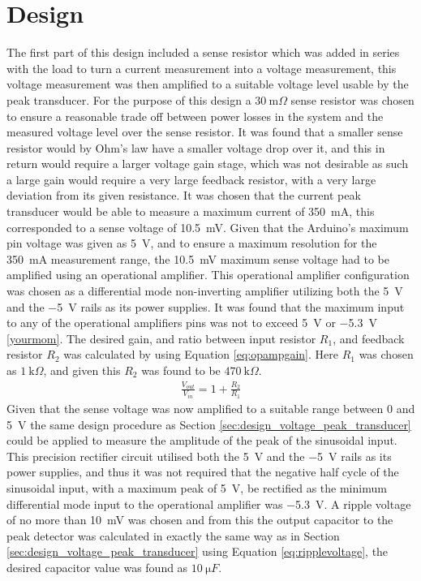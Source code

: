 \section{Design} \label{sec:design_current_peak_transducer}
The first part of this design included a sense resistor which was added in series with the load to turn a current measurement into a voltage measurement, this voltage measurement was then amplified to a suitable voltage level usable by the peak transducer. For the purpose of this design a $\SI{30}{\milli \Omega}$ sense resistor was chosen to ensure a reasonable trade off between power losses in the system and the measured voltage level over the sense resistor. It was found that a smaller sense resistor would by Ohm's law have a smaller voltage drop over it, and this in return would require a larger voltage gain stage, which was not desirable as such a large gain would require a very large feedback resistor, with a very large deviation from its given resistance. It was chosen that the current peak transducer would be able to measure a maximum current of \SI{350}{\milli A}, this corresponded to a sense voltage of \SI{10.5}{\milli V}.\newline
Given that the Arduino's maximum pin voltage was given as \SI{5}{\volt}, and to ensure a maximum resolution for the \SI{350}{\milli A} measurement range, the \SI{10.5}{\milli V} maximum sense voltage had to be amplified using an operational amplifier. This operational amplifier configuration was chosen as a differential mode non-inverting amplifier utilizing both the \SI{5}{\volt} and the \SI{-5}{\volt} rails as its power supplies. It was found that the maximum input to any of the operational amplifiers pins was not to exceed \SI{5}{\volt} or \SI{-5.3}{\volt} \ref{yourmom}.
The desired gain, and ratio between input resistor $R_1$, and feedback resistor $R_2$ was calculated by using Equation \ref{eq:opampgain}. Here $R_1$ was chosen as $\SI{1}{\kilo \Omega}$, and given this $R_2$ was found to be $\SI{470}{\kilo \Omega}$.\newline
\begin{align}
   \frac{V_{out}}{V_{in}}=1+\frac{R_2}{R_1}
   \label{eq:opampgain}
\end{align}
Given that the sense voltage was now amplified to a suitable range between 0 and \SI{5}{\volt} the same design procedure as Section \ref{sec:design_voltage_peak_transducer} could be applied to measure the amplitude of the peak of the sinusoidal input. This precision rectifier circuit utilised both the \SI{5}{\volt} and the \SI{-5}{\volt} rails as its power supplies, and thus it was not required that the negative half cycle of the sinusoidal input, with a maximum peak of \SI{5}{\volt}, be rectified as the minimum differential mode input to the operational amplifier was \SI{-5.3}{\volt}. A ripple voltage of no more than \SI{10}{\milli \volt} was chosen and from this the output capacitor to the peak detector was calculated in exactly the same way as in Section \ref{sec:design_voltage_peak_transducer} using Equation \ref{eq:ripplevoltage}, the desired capacitor value was found as $\SI{10}{\micro F}$.
